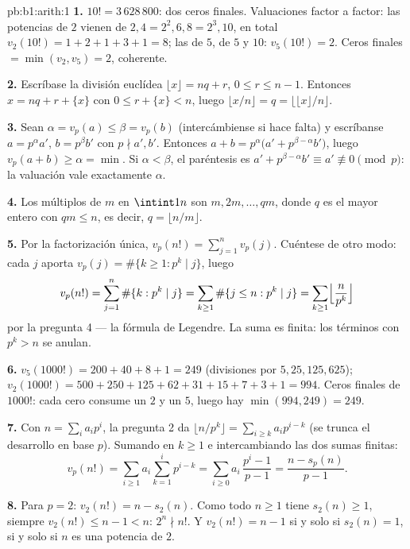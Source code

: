 \begin{solution}{pb:b1:arith:1}
\textbf{1.} $10! = 3\,628\,800$: dos ceros finales. Valuaciones factor
a factor: las potencias de $2$ vienen de $2, 4 = 2^2, 6, 8 = 2^3, 10$,
en total $v_2(10!) = 1 + 2 + 1 + 3 + 1 = 8$; las de $5$, de $5$ y
$10$: $v_5(10!) = 2$. Ceros finales $= \min(v_2, v_5) = 2$,
coherente.

\textbf{2.} Escríbase la división euclídea
$\lfloor x\rfloor = nq + r$, $0 \leq r \leq n - 1$. Entonces
$x = nq + r + \{x\}$ con $0 \leq r + \{x\} < n$, luego
$\lfloor x/n \rfloor = q = \bigl\lfloor \lfloor x \rfloor / n \bigr\rfloor$.

\textbf{3.} Sean $\alpha = v_p(a) \leq \beta = v_p(b)$
(intercámbiense si hace falta) y escríbanse $a = p^\alpha a'$,
$b = p^\beta b'$ con $p \nmid a', b'$. Entonces
$a + b = p^\alpha\bigl(a' + p^{\beta - \alpha}b'\bigr)$, luego
$v_p(a + b) \geq \alpha = \min$. Si $\alpha < \beta$, el paréntesis es
$a' + p^{\beta-\alpha}b' \equiv a' \not\equiv 0 \pmod p$: la valuación
vale exactamente $\alpha$.

\textbf{4.} Los múltiplos de $m$ en $\intint1n$ son
$m, 2m, \dots, qm$, donde $q$ es el mayor entero con $qm \leq n$, es
decir, $q = \lfloor n/m \rfloor$.

\textbf{5.} Por la factorización única,
$v_p(n!) = \sum_{j=1}^{n} v_p(j)$. Cuéntese de otro modo: cada $j$
aporta $v_p(j) = \#\{k \geq 1 : p^k \mid j\}$, luego
\[
v_p(n!) = \sum_{j=1}^n \#\{k : p^k \mid j\}
= \sum_{k\geq1} \#\{j \leq n : p^k \mid j\}
= \sum_{k\geq1} \Bigl\lfloor \frac n{p^k} \Bigr\rfloor
\]
por la pregunta 4 --- la fórmula de Legendre. La suma es finita: los
términos con $p^k > n$ se anulan.

\textbf{6.} $v_5(1000!) = 200 + 40 + 8 + 1 = 249$ (divisiones por
$5, 25, 125, 625$); $v_2(1000!) = 500 + 250 + 125 + 62 + 31 + 15 +
7 + 3 + 1 = 994$. Ceros finales de $1000!$: cada cero consume un $2$ y
un $5$, luego hay $\min(994, 249) = 249$.

\textbf{7.} Con $n = \sum_i a_ip^i$, la pregunta 2 da
$\lfloor n/p^k \rfloor = \sum_{i \geq k} a_ip^{i-k}$ (se trunca el
desarrollo en base $p$). Sumando en $k \geq 1$ e intercambiando las
dos sumas finitas:
\[
v_p(n!) = \sum_{i\geq1} a_i \sum_{k=1}^{i} p^{i-k}
= \sum_{i\geq0} a_i\,\frac{p^i - 1}{p - 1}
= \frac{n - s_p(n)}{p - 1} .
\]

\textbf{8.} Para $p = 2$: $v_2(n!) = n - s_2(n)$. Como todo $n \geq 1$
tiene $s_2(n) \geq 1$, siempre $v_2(n!) \leq n - 1 < n$:
$2^n \nmid n!$. Y $v_2(n!) = n - 1$ si y solo si $s_2(n) = 1$, si y
solo si $n$ es una potencia de $2$.


\end{solution}
